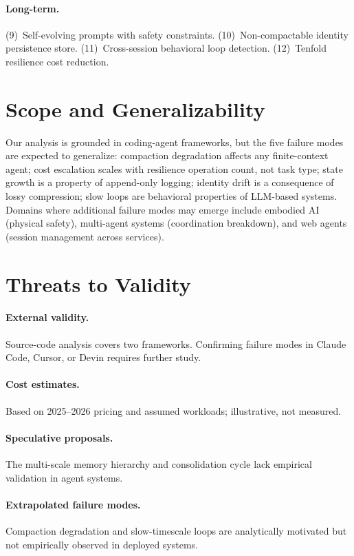 \documentclass{article}
\begin{document}
\paragraph{Long-term.} (9)~Self-evolving prompts with safety constraints. (10)~Non-compactable identity persistence store. (11)~Cross-session behavioral loop detection. (12)~Tenfold resilience cost reduction.

\section{Scope and Generalizability}

Our analysis is grounded in coding-agent frameworks, but the five failure modes are expected to generalize: compaction degradation affects any finite-context agent; cost escalation scales with resilience operation count, not task type; state growth is a property of append-only logging; identity drift is a consequence of lossy compression; slow loops are behavioral properties of LLM-based systems. Domains where additional failure modes may emerge include embodied AI (physical safety), multi-agent systems (coordination breakdown), and web agents (session management across services).

\section{Threats to Validity}

\paragraph{External validity.} Source-code analysis covers two frameworks. Confirming failure modes in Claude Code, Cursor, or Devin requires further study.
\paragraph{Cost estimates.} Based on 2025--2026 pricing and assumed workloads; illustrative, not measured.
\paragraph{Speculative proposals.} The multi-scale memory hierarchy and consolidation cycle lack empirical validation in agent systems.
\paragraph{Extrapolated failure modes.} Compaction degradation and slow-timescale loops are analytically motivated but not empirically observed in deployed systems.
\end{document}
